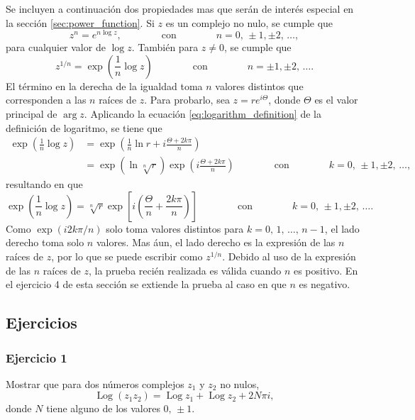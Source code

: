 \documentclass[a4paper]{report}
\DeclareMathOperator{\Log}{Log}
\begin{document}
Se incluyen a continuación dos propiedades mas que serán de interés especial en la sección \ref{sec:power_function}. Si \(z\) es un complejo no nulo, se cumple que 
\[
 z^n=e^{n\log z},
 \qquad\qquad\textrm{con}\qquad\qquad
 n=0,\,\pm1,\pm2,\,\dots,
\]
para cualquier valor de \(\log z\). También para \(z\neq0\), se cumple que 
\begin{equation}\label{eq:logarithm_of_root_n}
 z^{1/n}=\exp\left(\frac{1}{n}\log z\right)
 \qquad\qquad\textrm{con}\qquad\qquad
 n=\pm1,\pm2,\,\dots. 
\end{equation}
El término en la derecha de la igualdad toma \(n\) valores distintos que corresponden a las \(n\) raíces de \(z\). Para probarlo, sea \(z=re^{i\Theta}\), donde \(\Theta\) es el valor principal de \(\arg z\). Aplicando la ecuación \ref{eq:logarithm_definition} de la definición de logaritmo, se tiene que 
\begin{align*}
 \exp\left(\frac{1}{n}\log z\right)&=\exp\left(\frac{1}{n}\ln r+i\frac{\Theta+2k\pi}{n}\right)\\
  &=\exp\left(\ln\sqrt[n]{r}\right)\exp\left(i\frac{\Theta+2k\pi}{n}\right)
 \qquad\qquad\textrm{con}\qquad\qquad
 k=0,\,\pm1,\pm2,\,\dots,
\end{align*}
resultando en que 
\[
 \exp\left(\frac{1}{n}\log z\right)=\sqrt[n]{r}\exp\left[i\left(\frac{\Theta}{n}+\frac{2k\pi}{n}\right)\right]
 \qquad\qquad\textrm{con}\qquad\qquad
 k=0,\,\pm1,\pm2,\,\dots.
\]
Como \(\exp(i2k\pi/n)\) solo toma valores distintos para \(k=0,\,1,\,\dots,\,n-1\), el lado derecho toma solo \(n\) valores. Mas áun, el lado derecho es la expresión de las \(n\) raíces de \(z\), por lo que se puede escribir como \(z^{1/n}\). Debido al uso de la expresión de las \(n\) raíces de \(z\), la prueba recién realizada es válida cuando \(n\) es positivo. En el ejercicio 4 de esta sección se extiende la prueba al caso en que \(n\) es negativo.

\subsection*{Ejercicios}

\subsubsection{Ejercicio 1}

Mostrar que para dos números complejos \(z_1\) y \(z_2\) no nulos,
\[
 \Log(z_1z_2)=\Log z_1+\Log z_2+2N\pi i,
\]
donde \(N\) tiene alguno de los valores \(0,\,\pm1\).
\end{document}
